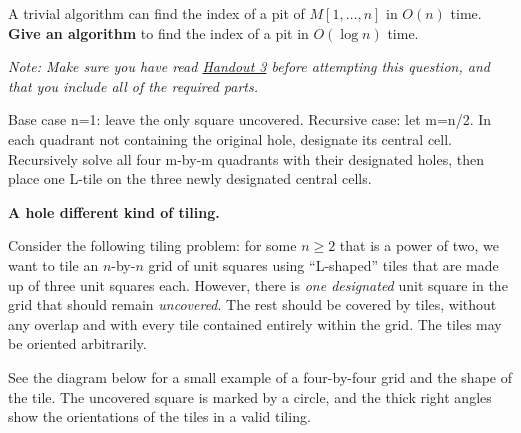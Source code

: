 \documentclass[11pt,addpoints,answers]{exam}
\begin{document}
\begin{questions}
  A trivial algorithm can find the index of a pit of $M[1,\ldots,n]$ in $O(n)$ time.
  \textbf{Give an algorithm} to find the index of a pit in $O(\log n)$ time.
      

   \textit{Note: Make sure you have read \href{https://drive.google.com/file/d/1LzHBuS9pBCy12QMJ91PyLaDOnNW4NFn0/view?usp=drive_link}{Handout 3} before attempting this question, and that you include all of the required parts.}
      
  \begin{solution}
Base case n=1: leave the only square uncovered. Recursive case: let m=n/2. In each quadrant not containing the original hole, designate its central cell. Recursively solve all four m-by-m quadrants with their designated holes, then place one L-tile on the three newly designated central cells.
\end{solution}



  \question \textbf{A hole different kind of tiling.} 

  Consider the following tiling problem: for some $n \geq 2$ that is a power of two, we want to tile an $n$-by-$n$ grid of unit squares using ``L-shaped'' tiles that are made up of three unit squares each.
  However, there is \emph{one designated} unit square in the grid that should remain \emph{uncovered}.
  The rest should be covered by tiles, without any overlap and with every tile contained entirely within the grid.
  The tiles may be oriented arbitrarily.

  See the diagram below for a small example of a four-by-four grid and the shape of the tile.
  The uncovered square is marked by a circle, and the thick right angles show the orientations of the tiles in a valid tiling.

  \begin{center}
  \end{center}
  

\end{questions}
\end{document}
